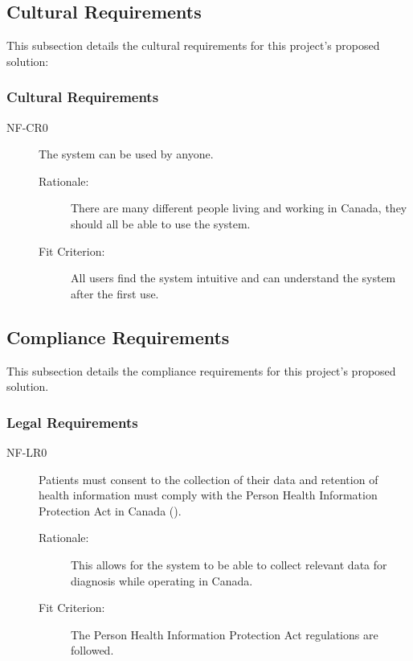\documentclass[12pt]{article}
\begin{document}
\subsection{Cultural Requirements}
This subsection details the cultural requirements for this project's proposed solution:

\subsubsection{Cultural Requirements}
\begin{description}
    \item[NF-CR0] The system can be used by anyone.
        \begin{description}
        \item[Rationale:] There are many different people living and working in Canada, they should all be able to use the system. 
        \item[Fit Criterion:] All users find the system intuitive and can understand the system after the first use. 
    \end{description}
\end{description}

\subsection{Compliance Requirements}
This subsection details the compliance requirements for this project's proposed solution.

\subsubsection{Legal Requirements}
\begin{description}
    \item[NF-LR0] Patients must consent to the collection of their data and retention of health information must comply with the Person Health Information Protection Act in Canada (\cite{PHIPA}). 
        \begin{description}
        \item[Rationale:] This allows for the system to be able to collect relevant data for diagnosis while operating in Canada. 
        \item[Fit Criterion:] The Person Health Information Protection Act regulations are followed. 
    \end{description}
\end{description}
\end{document}
